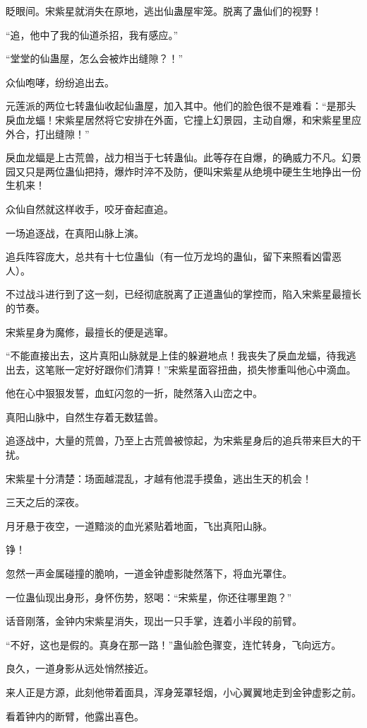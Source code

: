 \begin{this_body}
眨眼间。宋紫星就消失在原地，逃出仙蛊屋牢笼。脱离了蛊仙们的视野！

“追，他中了我的仙道杀招，我有感应。”

“堂堂的仙蛊屋，怎么会被炸出缝隙？！”

众仙咆哮，纷纷追出去。

元莲派的两位七转蛊仙收起仙蛊屋，加入其中。他们的脸色很不是难看：“是那头戾血龙蝠！宋紫星居然将它安排在外面，它撞上幻景园，主动自爆，和宋紫星里应外合，打出缝隙！”

戾血龙蝠是上古荒兽，战力相当于七转蛊仙。此等存在自爆，的确威力不凡。幻景园又只是两位蛊仙把持，爆炸时淬不及防，便叫宋紫星从绝境中硬生生地挣出一份生机来！

众仙自然就这样收手，咬牙奋起直追。

一场追逐战，在真阳山脉上演。

追兵阵容庞大，总共有十七位蛊仙（有一位万龙坞的蛊仙，留下来照看凶雷恶人）。

不过战斗进行到了这一刻，已经彻底脱离了正道蛊仙的掌控而，陷入宋紫星最擅长的节奏。

宋紫星身为魔修，最擅长的便是逃窜。

“不能直接出去，这片真阳山脉就是上佳的躲避地点！我丧失了戾血龙蝠，待我逃出去，这笔账一定好好跟你们清算！”宋紫星面容扭曲，损失惨重叫他心中滴血。

他在心中狠狠发誓，血虹闪忽的一折，陡然落入山峦之中。

真阳山脉中，自然生存着无数猛兽。

追逐战中，大量的荒兽，乃至上古荒兽被惊起，为宋紫星身后的追兵带来巨大的干扰。

宋紫星十分清楚：场面越混乱，才越有他混手摸鱼，逃出生天的机会！

三天之后的深夜。

月牙悬于夜空，一道黯淡的血光紧贴着地面，飞出真阳山脉。

铮！

忽然一声金属碰撞的脆响，一道金钟虚影陡然落下，将血光罩住。

一位蛊仙现出身形，身怀伤势，怒喝：“宋紫星，你还往哪里跑？”

话音刚落，金钟内宋紫星消失，现出一只手掌，连着小半段的前臂。

“不好，这也是假的。真身在那一路！”蛊仙脸色骤变，连忙转身，飞向远方。

良久，一道身影从远处悄然接近。

来人正是方源，此刻他带着面具，浑身笼罩轻烟，小心翼翼地走到金钟虚影之前。

看着钟内的断臂，他露出喜色。

\end{this_body}

